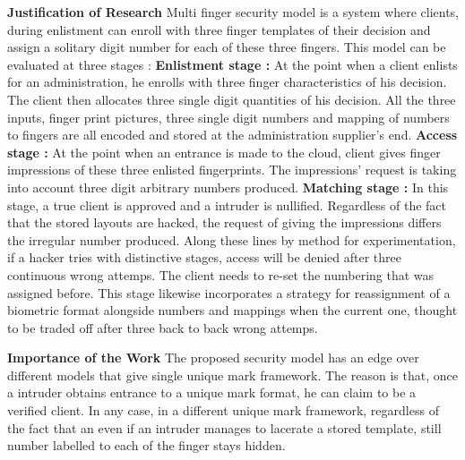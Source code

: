 \documentclass[12pt]{article}
\begin{document}
\textbf{\large Justification of Research} \newline \newline 
Multi finger security model is a system where clients, during enlistment can enroll with three finger templates of their decision and assign a solitary digit number for each of these three fingers. This model can be evaluated at three stages : \newline \newline
\textbf {Enlistment stage : } At the point when a client enlists for an administration, he enrolls with three finger characteristics of his decision. The client then allocates three single digit quantities of his decision. All the three inputs, finger print pictures, three single digit numbers and mapping of numbers to fingers are all encoded and stored at the administration supplier's end. \newline \newline
\textbf {Access stage : } At the point when an entrance is made to the cloud, client gives finger impressions of these three enlisted fingerprints. The impressions' request is taking into account three digit arbitrary numbers produced. \newline \newline
\textbf {Matching stage : } In this stage, a true client is approved and a intruder is nullified. Regardless of the fact that the stored layouts are hacked, the request of giving the impressions differs the irregular number produced. Along these lines by method for experimentation, if a hacker tries with distinctive stages, access will be denied after three continuous wrong attemps. The client needs to re-set the numbering that was assigned before. This stage likewise incorporates a strategy for reassignment of a biometric format alongside numbers and mappings when the current one, thought to be traded off after three back to back wrong attemps. \newline \newline

\textbf{\large Importance of the Work} \newline \newline
The proposed security model has an edge over different models that give single unique mark framework. The reason is that, once a intruder obtains entrance to a unique mark format, he can claim to be a verified client. In any case, in a different unique mark framework, regardless of the fact that an even if an intruder manages to lacerate a stored template, still number labelled to each of the finger stays hidden. \newline \newline
\end{document}
